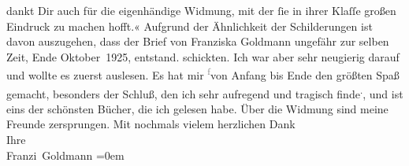 \begin{ledgroupsized}[t]{13cm}
{{{                  dankt Dir auch für die eigenhändige Widmung, mit der ſie in ihrer Klaſſe großen
                  Eindruck zu machen hofft.« Aufgrund der Ähnlichkeit der Schilderungen ist davon
                  auszugehen, dass der Brief von Franziska
                     Goldmann ungefähr zur selben Zeit, Ende Oktober 1925, entstand.}}}\label{K_L03539-1h} schickten. Ich war aber sehr neugierig
               darauf und wollte es zuerst auslesen. Es hat mir \substVorne{}\textsuperscript{\textcolor{gray}{f}}\substDazwischen{}v\substHinten{}on Anfang bis Ende den größten Spaß gemacht, besonders der Schluß, den ich
               sehr aufregend und tragisch finde\substVorne{}\textsuperscript{.}\substDazwischen{},\substHinten{} und ist eins der schönsten Bücher, die ich gelesen habe. Über die Widmung
               sind meine \label{T_L03539-1v}\label{T_L03539-1h} Freunde zersprungen.\pend
           \pstart
           {\pb}Mit nochmals vielem herzlichen Dank {\\[\baselineskip]}Ihre {\\[\baselineskip]}\spacefill\mbox{Franzi Goldmann}\pend
           \leftskip=0em{}
         
         \endnumbering{}\end{ledgroupsized}  \newcommand{\dateiname}{L03539}\newcommand{\titel}{Franziska Goldmann an Arthur Schnitzler, [Ende Oktober 1925?]}\newcommand{\editorInnen}{Martin Anton Müller und Laura Untner}
      
